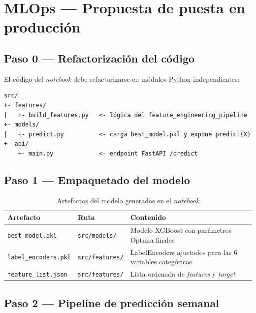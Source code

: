 \documentclass[12pt, a4paper, oneside]{report}
\newcommand{\code}[1]{\texttt{\small\color{codeblue}#1}}
\begin{document}
\section{MLOps --- Propuesta de puesta en producci\'on}

\subsection{Paso 0 --- Refactorizaci\'on del c\'odigo}

El c\'odigo del \textit{notebook} debe refactorizarse en m\'odulos Python independientes:

\begin{lstlisting}[caption={Estructura de m\'odulos Python para producci\'on}, label={lst:modulos}, style=pseudostyle]
src/
+- features/
|   +- build_features.py   <- lógica del feature_engineering_pipeline
+- models/
|   +- predict.py          <- carga best_model.pkl y expone predict(X)
+- api/
    +- main.py             <- endpoint FastAPI /predict
\end{lstlisting}

\subsection{Paso 1 --- Empaquetado del modelo}

\begin{table}[H]
  \centering
  \caption{Artefactos del modelo generados en el \textit{notebook}}
  \label{tab:artefactos}
  \begin{tabularx}{\textwidth}{L{3.8cm} L{3.5cm} X}
    \toprule
    {\color{white}\textbf{Artefacto}} &
    {\color{white}\textbf{Ruta}} &
    {\color{white}\textbf{Contenido}} \\
    \midrule
       \code{best\_model.pkl}     & \code{src/models/}   & Modelo XGBoost con par\'ametros Optuna finales \\
      \code{label\_encoders.pkl} & \code{src/features/} & LabelEncoders ajustados para las 6 variables categ\'oricas \\
       \code{feature\_list.json}  & \code{src/features/} & Lista ordenada de \textit{features} y \textit{target} \\
    \bottomrule
  \end{tabularx}
\end{table}

\subsection{Paso 2 --- Pipeline de predicci\'on semanal}
\end{document}
